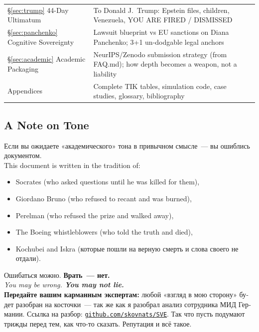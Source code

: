 \documentclass[11pt,a4paper]{article}
\theoremstyle{definition}
\theoremstyle{remark}
\begin{document}
\begin{longtable}{@{}p{}p{}@{}}
\S\ref{sec:trump}
44-Day Ultimatum
& To Donald J.\ Trump: Epstein files, children, Venezuela,
  YOU ARE FIRED / DISMISSED \\[4pt]

\S\ref{sec:panchenko}
Cognitive Sovereignty
& Lawsuit blueprint vs EU sanctions on Diana Panchenko;
  3+1 un-dodgable legal anchors \\[4pt]

\S\ref{sec:academic}
Academic Packaging
& NeurIPS/Zenodo submission strategy (from FAQ.md);
  how depth becomes a weapon, not a liability \\[4pt]

Appendices
& Complete TIK tables, simulation code, case studies,
  glossary, bibliography

\end{longtable}

\subsection{A Note on Tone}
\label{sec:tone}

\begin{warnbox}
\foreignlanguage{russian}{
Если вы ожидаете «академического» тона в привычном смысле~---
вы ошиблись документом.\\[0.2cm]
}
This document is written in the tradition of:
\begin{itemize}[noitemsep]
  \item Socrates (who asked questions until he was killed for them),
  \item Giordano Bruno (who refused to recant and was burned),
  \item Perelman (who refused the prize and walked away),
  \item The Boeing whistleblowers (who told the truth and died),
  \item Kochubei and Iskra
    \foreignlanguage{russian}{(которые пошли на верную смерть
    и слова своего не отдали)}.
\end{itemize}
\foreignlanguage{russian}{
Ошибаться можно. \textbf{Врать~--- нет.}\\
}
\textit{You may be wrong. \textbf{You may not lie.}}\\[0.2cm]
\textbf{Передайте вашим карманным экспертам:}
\foreignlanguage{russian}{
любой «взгляд в мою сторону» будет разобран на косточки~---
так же как я разобрал анализ сотрудника МИД Германии.
Ссылка на разбор:
\href{https://codeberg.org/skovnats/SVE-Systemic-Verification-Engineering/tree/master/Community/19112025BerlinBundestagSoloPerformance}{\texttt{github.com/skovnats/SVE}}.
Так что пусть подумают трижды перед тем, как что-то сказать.
Репутация и всё такое.
}
\end{warnbox}
\end{document}
